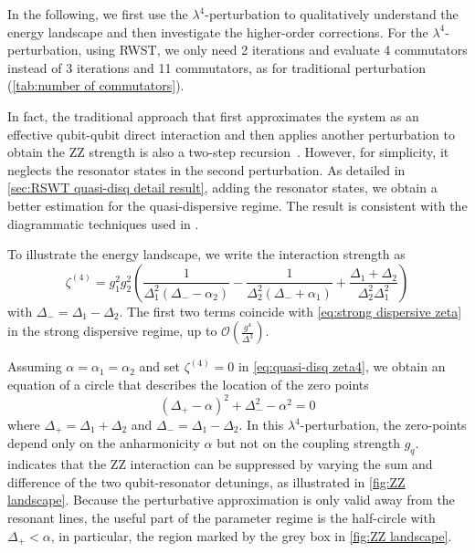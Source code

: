 \documentclass[%
 reprint,
 amsmath,amssymb,
 aps,
pra,
noeprint,
superscriptaddress,
]{revtex4-2}
\begin{document}
In the following, we first use the $\lambda^4$-perturbation to qualitatively understand the energy landscape and then investigate the higher-order corrections.
For the $\lambda^4$-perturbation, using RWST, we only need 2 iterations and evaluate 4 commutators instead of 3 iterations and 11 commutators, as for traditional perturbation (\cref{tab:number of commutators}).

In fact, the traditional approach that first approximates the system as an effective qubit-qubit direct interaction and then applies another perturbation to obtain the ZZ strength is also a two-step recursion~\cite{Magesan2020}.
However, for simplicity, it neglects the resonator states in the second perturbation.
As detailed in \cref{sec:RSWT quasi-disq detail result}, adding the resonator states, we obtain a better estimation for the quasi-dispersive regime.
The result is consistent with the diagrammatic techniques used in \cite{Zhu2013,Zhao2020}.

To illustrate the energy landscape, we write the interaction strength as
\begin{equation}
    \zeta^{(4)} = g_1^2 g_2^2 \left(
    \frac{1}{\Delta_1^2(\Delta_{-} - \alpha_2)} -
    \frac{1}{\Delta_2^2(\Delta_{-} + \alpha_1)} +
    \frac{\Delta_1+\Delta_2}{\Delta_2^2\Delta_1^2}
    \right)
    \label{eq:quasi-disq zeta4}
\end{equation}
with $\Delta_{-} = \Delta_1 - \Delta_2$.
The first two terms coincide with \cref{eq:strong dispersive zeta} in the strong dispersive regime, up to $\mathcal{O}(\frac{g^4}{\Delta^3})$.


Assuming $\alpha=\alpha_1=\alpha_2$ and set $\zeta^{(4)} = 0$ in \cref{eq:quasi-disq zeta4}, we obtain an equation of a circle that describes the location of the zero points
\begin{equation}
\boxed{
    (\Delta_+ - \alpha)^2 + \Delta_-^2 - \alpha^2 = 0
    }
    \label{eq:zero points zeta4}
\end{equation}
where $\Delta_+ = \Delta_1+\Delta_2$ and $\Delta_- = \Delta_1-\Delta_2$.
In this $\lambda^4$-perturbation, the zero-points depend only on the anharmonicity $\alpha$ but not on the coupling strength $g_q$.
 indicates that the ZZ interaction can be suppressed by varying the sum and difference of the two qubit-resonator detunings, as illustrated in \cref{fig:ZZ landscape}.
Because the perturbative approximation is only valid away from the resonant lines, the useful part of the parameter regime is the half-circle with $\Delta_+ < \alpha$, in particular, the region marked by the grey box in \cref{fig:ZZ landscape}.
\end{document}
